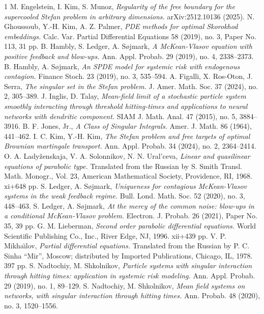 \documentclass{article}
\numberwithin{equation}{section}
\numberwithin{figure}{section}
\theoremstyle{plain}
\theoremstyle{plain}
\theoremstyle{plain}
\theoremstyle{plain}
\theoremstyle{definition}
\theoremstyle{remark}
\begin{document}
\begin{thebibliography}{1}
 M. Engelstein, I. Kim, S. Munoz, {\it Regularity of the free boundary for the supercooled Stefan problem in arbitrary dimensions.} arXiv:2512.10136 (2025).
 N. Ghoussoub, Y.-H. Kim, A. Z. Palmer, {\it PDE methods for optimal Skorokhod embeddings.} Calc. Var. Partial Differential Equations 58 (2019), no. 3, Paper No. 113, 31 pp.
 B. Hambly, S. Ledger, A. S\o jmark, {\it A McKean-Vlasov equation with positive feedback and blow-ups.} Ann. Appl. Probab. 29 (2019), no. 4, 2338--2373.
 B. Hambly, A. S\o jmark, {\it An SPDE model for systemic risk with endogenous contagion.} Finance Stoch. 23 (2019), no. 3, 535–594.
 A. Figalli, X. Ros-Oton, J. Serra, {\it The singular set in the Stefan problem.} J. Amer. Math. Soc. 37 (2024), no. 2, 305--389.
 J. Inglis, D. Talay, {\it Mean-field limit of a stochastic particle system smoothly interacting through threshold hitting-times and applications to neural networks with dendritic component.} SIAM J. Math. Anal. 47 (2015), no. 5, 3884–3916.
 B. F. Jones, Jr., {\it A Class of Singular Integrals.} Amer. J. Math. 86 (1964), 441–462.
I. C. Kim, Y.-H. Kim, {\it The Stefan problem and free targets of optimal Brownian martingale transport.} Ann. Appl. Probab. 34 (2024), no. 2, 2364–2414.
 O. A. Lady\v{z}enskaja, V. A. Solonnikov, N. N. Ural'ceva, {\it Linear and quasilinear equations of parabolic type.} Translated from the Russian by S. Smith Transl. Math. Monogr., Vol. 23, American Mathematical Society, Providence, RI, 1968. xi+648 pp.
 S. Ledger, A. S\o jmark, {\it Uniqueness for contagious McKean-Vlasov systems in the weak feedback regime.} Bull. Lond. Math. Soc. 52 (2020), no. 3, 448–463.
 S. Ledger, A. S\o jmark, {\it At the mercy of the common noise: blow-ups in a conditional McKean-Vlasov problem.} Electron. J. Probab. 26 (2021), Paper No. 35, 39 pp.
 G. M. Lieberman, {\it Second order parabolic differential equations.} World Scientific Publishing Co., Inc., River Edge, NJ, 1996. xii+439 pp.
 V. P. Mikha\u\i lov, {\it Partial differential equations.} Translated from the Russian by P. C. Sinha
``Mir'', Moscow; distributed by Imported Publications, Chicago, IL, 1978. 397 pp.
 S. Nadtochiy, M. Shkolnikov, {\it Particle systems with singular interaction through hitting times: application in systemic risk modeling.} Ann. Appl. Probab. 29 (2019), no. 1, 89–129.
S. Nadtochiy, M. Shkolnikov, {\it Mean field systems on networks, with singular interaction through hitting times.} Ann. Probab. 48 (2020), no. 3, 1520–1556.

\end{thebibliography}
\end{document}
